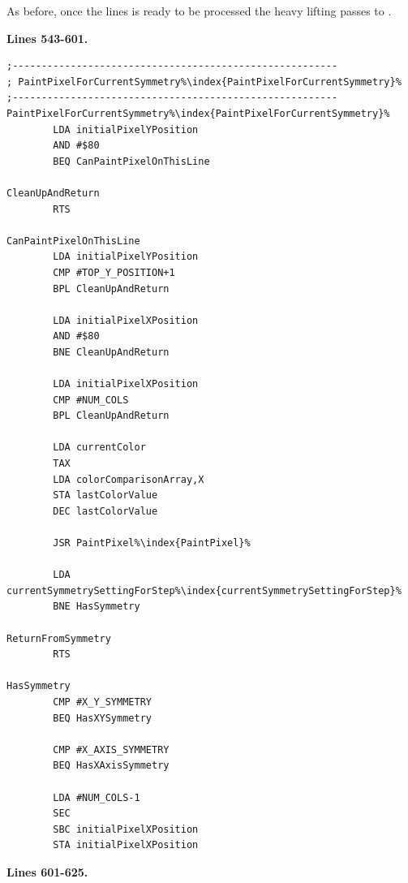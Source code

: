 As before, once the lines is ready to be processed the heavy lifting passes to .

\clearpage
\textbf{Lines 543-601. } 
\begin{lstlisting}[escapechar=\%]
;--------------------------------------------------------
; PaintPixelForCurrentSymmetry%\index{PaintPixelForCurrentSymmetry}%
;--------------------------------------------------------
PaintPixelForCurrentSymmetry%\index{PaintPixelForCurrentSymmetry}%   
        LDA initialPixelYPosition
        AND #$80
        BEQ CanPaintPixelOnThisLine

CleanUpAndReturn   
        RTS 

CanPaintPixelOnThisLine   
        LDA initialPixelYPosition
        CMP #TOP_Y_POSITION+1
        BPL CleanUpAndReturn

        LDA initialPixelXPosition
        AND #$80
        BNE CleanUpAndReturn

        LDA initialPixelXPosition
        CMP #NUM_COLS
        BPL CleanUpAndReturn

        LDA currentColor
        TAX 
        LDA colorComparisonArray,X
        STA lastColorValue
        DEC lastColorValue

        JSR PaintPixel%\index{PaintPixel}%

        LDA currentSymmetrySettingForStep%\index{currentSymmetrySettingForStep}%
        BNE HasSymmetry

ReturnFromSymmetry   
        RTS 

HasSymmetry   
        CMP #X_Y_SYMMETRY
        BEQ HasXYSymmetry

        CMP #X_AXIS_SYMMETRY
        BEQ HasXAxisSymmetry

        LDA #NUM_COLS-1
        SEC 
        SBC initialPixelXPosition
        STA initialPixelXPosition

\end{lstlisting}
\clearpage
\textbf{Lines 601-625. } 
